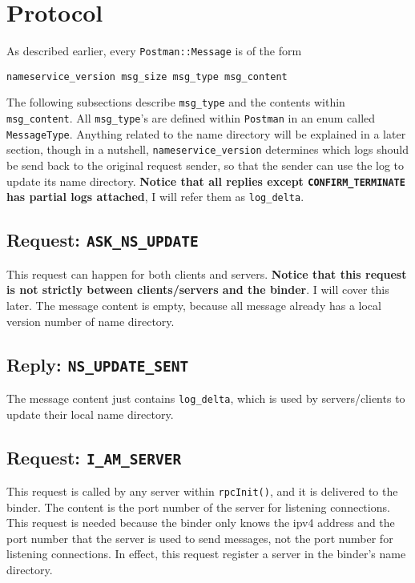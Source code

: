 \section{Protocol}
As described earlier, every {\tt Postman::Message} is of the form

\begin{verbatim}
nameservice_version msg_size msg_type msg_content
\end{verbatim}
The following subsections describe {\tt msg\_type} and the contents within {\tt msg\_content}.
All {\tt msg\_type}'s are defined within {\tt Postman} in an enum called {\tt MessageType}.
Anything related to the name directory will be explained in a later section, though in a nutshell, {\tt nameservice\_version} determines which logs should be send back to the original request sender, so that the sender can use the log to update its name directory.
{\bf Notice that all replies except {\tt CONFIRM\_TERMINATE} has partial logs attached}, I will refer them as {\tt log\_delta}.

\subsection{Request: \tt ASK\_NS\_UPDATE}
This request can happen for both clients and servers.
{\bf Notice that this request is not strictly between clients/servers and the binder}.
I will cover this later.
The message content is empty, because all message already has a local version number of name directory.

\subsection{Reply: \tt NS\_UPDATE\_SENT}
The message content just contains {\tt log\_delta}, which is used by servers/clients to update their local name directory.

\subsection{Request: \tt I\_AM\_SERVER}
This request is called by any server within {\tt rpcInit()}, and it is delivered to the binder.
The content is the port number of the server for listening connections.
This request is needed because the binder only knows the ipv4 address and the port number that the server is used to send messages, not the port number for listening connections.
In effect, this request register a server in the binder's name directory.

